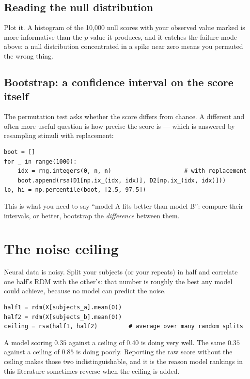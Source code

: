 \documentclass[11pt]{article}
\begin{document}
\subsection{Reading the null distribution}

Plot it. A histogram of the 10,000 null scores with your observed value marked
is more informative than the $p$-value it produces, and it catches the failure
mode above: a null distribution concentrated in a spike near zero means you
permuted the wrong thing.

\subsection{Bootstrap: a confidence interval on the score itself}

The permutation test asks whether the score differs from chance. A different and
often more useful question is how precise the score is --- which is answered by
resampling stimuli with replacement:

\begin{lstlisting}
boot = []
for _ in range(1000):
    idx = rng.integers(0, n, n)                     # with replacement
    boot.append(rsa(D1[np.ix_(idx, idx)], D2[np.ix_(idx, idx)]))
lo, hi = np.percentile(boot, [2.5, 97.5])
\end{lstlisting}

This is what you need to say ``model A fits better than model B'': compare their
intervals, or better, bootstrap the \emph{difference} between them.

\section{The noise ceiling}

Neural data is noisy. Split your subjects (or your repeats) in half and
correlate one half's RDM with the other's: that number is roughly the best any
model could achieve, because no model can predict the noise.

\begin{lstlisting}
half1 = rdm(X[subjects_a].mean(0))
half2 = rdm(X[subjects_b].mean(0))
ceiling = rsa(half1, half2)         # average over many random splits
\end{lstlisting}

\begin{keybox}
 A model scoring $0.35$ against a
ceiling of $0.40$ is doing very well. The same $0.35$ against a ceiling of
$0.85$ is doing poorly. Reporting the raw score without the ceiling makes those
two indistinguishable, and it is the reason model rankings in this literature
sometimes reverse when the ceiling is added.
\end{keybox}
\end{document}
